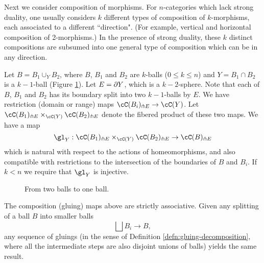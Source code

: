 Next we consider composition of morphisms.
For $n$-categories which lack strong duality, one usually considers
$k$ different types of composition of $k$-morphisms, each associated to a different ``direction".
(For example, vertical and horizontal composition of 2-morphisms.)
In the presence of strong duality, these $k$ distinct compositions are subsumed into 
one general type of composition which can be in any direction.

\begin{axiom}[Composition]
\label{axiom:composition}
Let $B = B_1 \cup_Y B_2$, where $B$, $B_1$ and $B_2$ are $k$-balls ($0\le k\le n$)
and $Y = B_1\cap B_2$ is a $k{-}1$-ball (Figure \ref{blah5}).
Let $E = \partial Y$, which is a $k{-}2$-sphere.
Note that each of $B$, $B_1$ and $B_2$ has its boundary split into two $k{-}1$-balls by $E$.
We have restriction (domain or range) maps $\cC(B_i)\trans E \to \cC(Y)$.
Let $\cC(B_1)\trans E \times_{\cC(Y)} \cC(B_2)\trans E$ denote the fibered product of these two maps. 
We have a map
\[
	\gl_Y : \cC(B_1)\trans E \times_{\cC(Y)} \cC(B_2)\trans E \to \cC(B)\trans E
\]
which is natural with respect to the actions of homeomorphisms, and also compatible with restrictions
to the intersection of the boundaries of $B$ and $B_i$.
If $k < n$
we require that $\gl_Y$ is injective.
\end{axiom}

\begin{figure}[t] \centering
{}
\caption{From two balls to one ball.}\label{blah5}\end{figure}

\begin{axiom} \label{nca-assoc}
The composition (gluing) maps above are strictly associative.
Given any splitting of a ball $B$ into smaller balls
$$\bigsqcup B_i \to B,$$ 
any sequence of gluings (in the sense of Definition \ref{defn:gluing-decomposition}, where all the intermediate steps are also disjoint unions of balls) yields the same result.
\end{axiom}


